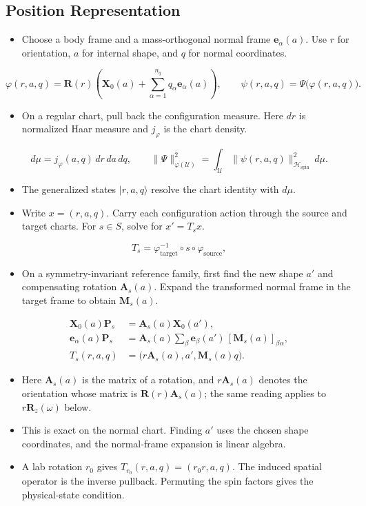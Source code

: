 \documentclass[12pt]{article}
\newcommand{\spin}{\mathcal{H}_{\mathrm{spin}}}
\newcommand{\X}{\mathbf{X}}                 %
\newcommand{\Pmat}[1]{\mathbf{P}_{#1}}      %
\newcommand{\Rmat}{\mathbf{R}}              %
\newcommand{\jdens}{j_\varphi}              %
\begin{document}
\subsection{Position Representation}
\label{sec:position-coordinates}
\begin{itemize}
\item Choose a body frame and a mass-orthogonal normal frame $\mathbf e_\alpha(a)$.
Use $r$ for orientation, $a$ for internal shape, and $q$ for normal coordinates.
\end{itemize}
\[
\varphi(r,a,q)=\Rmat(r)\left(\X_0(a)+\sum_{\alpha=1}^{n_q}q_\alpha\mathbf e_\alpha(a)\right),
\qquad\psi(r,a,q)=\Psi\bigl(\varphi(r,a,q)\bigr).
\]
\begin{itemize}
\item On a regular chart, pull back the configuration measure.
Here $dr$ is normalized Haar measure and $\jdens$ is the chart density.
\end{itemize}
\[
d\mu=\jdens(a,q)\,dr\,da\,dq,
\qquad
\|\Psi\|_{\varphi(\mathcal U)}^2
=\int_{\mathcal U}\|\psi(r,a,q)\|_{\spin}^2\,d\mu.
\]
\begin{itemize}
\item The generalized states $|r,a,q\rangle$ resolve the chart identity with $d\mu$.
\item Write $x=(r,a,q)$. Carry each configuration action through the
source and target charts. For $s\in S$, solve for $x'=T_sx$.
\end{itemize}
\[
T_s=\varphi_{\mathrm{target}}^{-1}\circ s\circ\varphi_{\mathrm{source}},
\]
\begin{itemize}
\item On a symmetry-invariant reference family, first find the new
shape $a'$ and compensating rotation $\mathbf A_s(a)$. Expand the transformed
normal frame in the target frame to obtain $\mathbf M_s(a)$.
\end{itemize}
\[
\begin{aligned}
\X_0(a)\Pmat{s}&=\mathbf A_s(a)\X_0(a'),\\
\mathbf e_\alpha(a)\Pmat{s}&=\mathbf A_s(a)\sum_\beta\mathbf e_\beta(a')\,[\mathbf M_s(a)]_{\beta\alpha},\\
T_s(r,a,q)&=\bigl(r\mathbf A_s(a),a',\mathbf M_s(a)q\bigr).
\end{aligned}
\]
\begin{itemize}
\item Here $\mathbf A_s(a)$ is the matrix of a rotation, and $r\mathbf A_s(a)$
denotes the orientation whose matrix is $\Rmat(r)\mathbf A_s(a)$; the same
reading applies to $r\Rmat_z(\omega)$ below.
\item This is exact on the normal chart. Finding $a'$ uses the chosen
shape coordinates, and the normal-frame expansion is linear algebra.
\item A lab rotation $r_0$ gives $T_{r_0}(r,a,q)=(r_0r,a,q)$.
The induced spatial operator is the inverse pullback. Permuting the
spin factors gives the physical-state condition.
\end{itemize}
\end{document}
